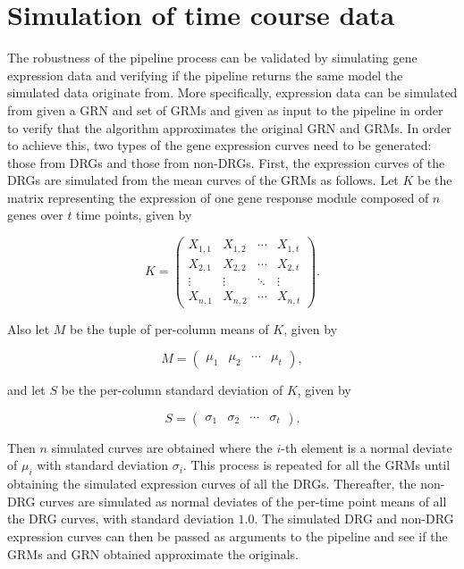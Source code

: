 \documentclass[final,letterpaper,twoside,12pt]{article}
\begin{document}
\section{Simulation of time course data}
\label{section:simulation}

\par The robustness of the pipeline process can be validated by simulating gene expression data and verifying if the pipeline returns the same model the simulated data originate from. More specifically, expression data can be simulated from given a GRN and set of GRMs and given as input to the pipeline in order to verify that the algorithm approximates the original GRN and GRMs. In order to achieve this, two types of the gene expression curves need to be generated: those from DRGs and those from non-DRGs. First, the expression curves of the DRGs are simulated from the mean curves of the GRMs as follows. Let $K$ be the matrix representing the expression of one gene response module composed of $n$ genes over $t$ time points, given by

\begin{equation*}
K = 
 \begin{pmatrix}
  X_{1,1} & X_{1,2} & \cdots & X_{1,t} \\
  X_{2,1} & X_{2,2} & \cdots & X_{2,t} \\
  \vdots  & \vdots  & \ddots & \vdots  \\
  X_{n,1} & X_{n,2} & \cdots & X_{n,t} 
 \end{pmatrix}.

\end{equation*}
 
\par Also let $M$ be the tuple of per-column means of $K$, given by

\begin{equation*}
M = 
 \begin{pmatrix}
  \mu_{1} & \mu_{2} & \cdots & \mu_{t}
 \end{pmatrix},
\end{equation*}

and let $S$ be the per-column standard deviation of $K$, given by

\begin{equation*}
S = 
 \begin{pmatrix}
  \sigma_{1} & \sigma_{2} & \cdots & \sigma_{t}
 \end{pmatrix}.
\end{equation*}

Then $n$ simulated curves are obtained where the $i$-th element is a normal deviate of $\mu_{i}$ with standard deviation $\sigma_{i}$. This process is repeated for all the GRMs until obtaining the simulated expression curves of all the DRGs. Thereafter, the non-DRG curves are simulated as normal deviates of the per-time point means of all the DRG curves, with standard deviation $1.0$. The simulated DRG and non-DRG expression curves can then be passed as arguments to the pipeline and see if the GRMs and GRN obtained approximate the originals.
\end{document}
